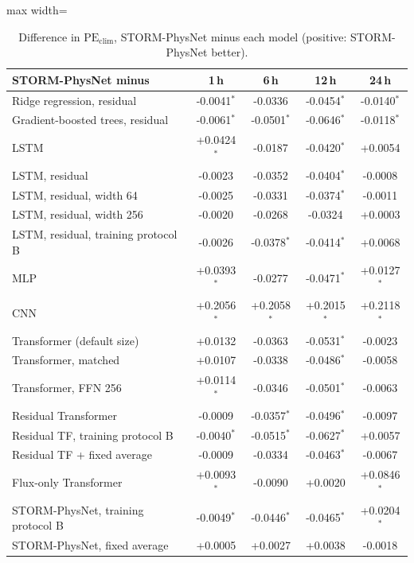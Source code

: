 \begin{table}[!t]
\centering
\caption{Difference in $\mathrm{PE}_\mathrm{clim}$, STORM-PhysNet minus each model (positive: STORM-PhysNet better).}
\label{tab:paired}
\footnotesize
\setlength{\tabcolsep}{4pt}
\begin{adjustbox}{max width=\linewidth}
\begin{tabular}{lcccc}
\toprule
STORM-PhysNet minus & 1\,h & 6\,h & 12\,h & 24\,h \\
\midrule
Ridge regression, residual & -0.0041$^{*}$ & -0.0336 & -0.0454$^{*}$ & -0.0140$^{*}$ \\
Gradient-boosted trees, residual & -0.0061$^{*}$ & -0.0501$^{*}$ & -0.0646$^{*}$ & -0.0118$^{*}$ \\
LSTM & +0.0424$^{*}$ & -0.0187 & -0.0420$^{*}$ & +0.0054 \\
LSTM, residual & -0.0023 & -0.0352 & -0.0404$^{*}$ & -0.0008 \\
LSTM, residual, width 64 & -0.0025 & -0.0331 & -0.0374$^{*}$ & -0.0011 \\
LSTM, residual, width 256 & -0.0020 & -0.0268 & -0.0324 & +0.0003 \\
LSTM, residual, training protocol B & -0.0026 & -0.0378$^{*}$ & -0.0414$^{*}$ & +0.0068 \\
MLP & +0.0393$^{*}$ & -0.0277 & -0.0471$^{*}$ & +0.0127$^{*}$ \\
CNN & +0.2056$^{*}$ & +0.2058$^{*}$ & +0.2015$^{*}$ & +0.2118$^{*}$ \\
Transformer (default size) & +0.0132 & -0.0363 & -0.0531$^{*}$ & -0.0023 \\
Transformer, matched & +0.0107 & -0.0338 & -0.0486$^{*}$ & -0.0058 \\
Transformer, FFN 256 & +0.0114$^{*}$ & -0.0346 & -0.0501$^{*}$ & -0.0063 \\
Residual Transformer & -0.0009 & -0.0357$^{*}$ & -0.0496$^{*}$ & -0.0097 \\
Residual TF, training protocol B & -0.0040$^{*}$ & -0.0515$^{*}$ & -0.0627$^{*}$ & +0.0057 \\
Residual TF + fixed average & -0.0009 & -0.0334 & -0.0463$^{*}$ & -0.0067 \\
Flux-only Transformer & +0.0093$^{*}$ & -0.0090 & +0.0020 & +0.0846$^{*}$ \\
STORM-PhysNet, training protocol B & -0.0049$^{*}$ & -0.0446$^{*}$ & -0.0465$^{*}$ & +0.0204$^{*}$ \\
STORM-PhysNet, fixed average & +0.0005 & +0.0027 & +0.0038 & -0.0018 \\

\end{tabular}
\end{adjustbox}
\end{table}
